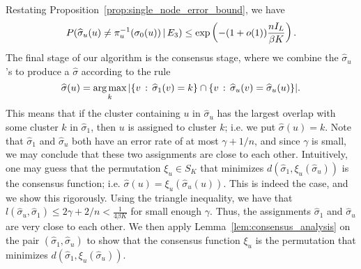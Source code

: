 \documentclass{article}
\begin{document}
Restating Proposition~\ref{prop:single_node_error_bound}, we have
\[
 P( \widehat{\sigma}_u(u) \neq \pi^{-1}_u(\sigma_0(u)) {\,|\,} E_3) \leq \exp\left( - (1+o(1)) \frac{n I_L}{\beta K} \right).
\]
The final stage of our algorithm is the consensus stage, where we combine the $\hat \sigma_u$'s to produce a $\hat \sigma$ according to the rule
\[
\widehat{\sigma}(u) = \mathop{\text{\rm arg\,max}}_k | \{ v \,:\,  \widehat{\sigma}_1(v) = k \} \cap
                                 \{ v \,:\, \widehat{\sigma}_u(v) = \widehat{\sigma}_u(u) \}|.
\]
This means that if the cluster containing $u$ in $\hat \sigma_u$ has the largest overlap with some cluster $k$ in $\hat \sigma_1$, then $u$ is assigned to cluster $k$; i.e. we put $\hat \sigma (u) = k.$ Note that $\hat \sigma_1$ and $\hat \sigma_u$ both have an error rate of at most $\gamma + 1/n$, and since $\gamma$ is small, we may conclude that these two assignments are close to each other. Intuitively, one may guess that the permutation $\xi_u \in S_K$ that minimizes $d(\hat \sigma_1, \xi_u(\hat \sigma_u))$ is the consensus function; i.e. $\hat \sigma(u) = \xi_u(\hat \sigma_u(u))$. This is indeed the case, and we show this rigorously. Using the triangle inequality, we have that $l(\hat{\sigma}_u, \hat{\sigma}_1) \leq 2\gamma + 2/n < \frac{1}{4\beta K}$ for small enough $\gamma$. Thus, the assignments $\hat \sigma_1$ and $\hat \sigma_u$ are very close to each other. We then apply Lemma~\ref{lem:consensus_analysis} on the pair $(\hat{\sigma}_1, \hat{\sigma}_u)$ to show that the consensus function $\xi_u$ is the permutation that minimizes $d(\hat{\sigma}_1, \xi_u(\hat{\sigma}_u))$.
\end{document}
